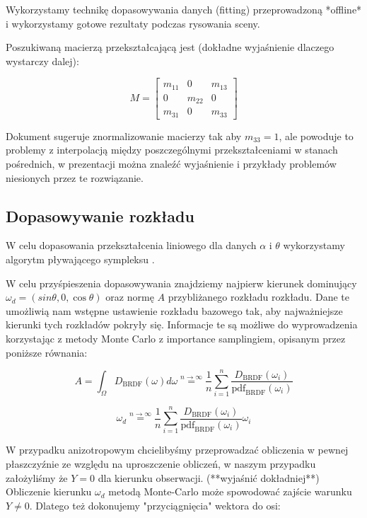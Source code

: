 \documentclass[../main.tex]{subfiles}
\begin{document}
Wykorzystamy technikę dopasowywania danych (fitting) przeprowadzoną
*offline* i wykorzystamy gotowe rezultaty podczas rysowania sceny.

Poszukiwaną macierzą przekształcającą jest (dokładne wyjaśnienie dlaczego
wystarczy dalej):

$$
M =
\begin{bmatrix}
  m_{11} & 0 & m_{13} \\
  0 & m_{22} & 0 \\
  m_{31} & 0 & m_{33}
\end{bmatrix}
$$

Dokument \cite{ltc_heitz} sugeruje znormalizowanie macierzy tak aby $m_{33}=1$,
ale powoduje to problemy z interpolacją między poszczególnymi przekształceniami
w stanach pośrednich, w prezentacji \cite{LTCJourneyPresentation} można znaleźć
wyjaśnienie i przykłady problemów niesionych przez te rozwiązanie.

\subsection{Dopasowywanie rozkładu}

W celu dopasowania przekształcenia liniowego dla danych $\alpha$
i $\theta$ wykorzystamy algorytm pływającego sympleksu \cite{NelderMead65}.

W celu przyśpieszenia dopasowywania znajdziemy najpierw kierunek dominujący
  $\omega_d = \left(sin\theta, 0, \cos\theta\right)$
oraz normę $A$ przybliżanego rozkładu rozkładu. Dane te umożliwią nam wstępne
ustawienie rozkładu bazowego tak, aby najważniejsze kierunki tych rozkładów
pokryły się. Informacje te są możliwe do wyprowadzenia korzystając z metody
Monte Carlo z importance samplingiem, opisanym przez poniższe równania:

$$
A = \int_{\Omega} D_{\text{BRDF}}(\omega)d\omega
\stackrel{n \rightarrow \infty}{=}
\frac{1}{n} \sum_{i=1}^{n} {
  \frac{
    D_{\text{BRDF}}(\omega_i)
  }{
    \text{pdf}_{\text{BRDF}}(\omega_i)
  }
}
$$

$$
\omega_d
\stackrel{n \rightarrow \infty}{=}
\frac{1}{n} \sum_{i=1}^{n} {
  \frac{
    D_{\text{BRDF}}(\omega_i)
  }{
    \text{pdf}_{\text{BRDF}}(\omega_i)
  }
  \omega_i
}
$$

W przypadku anizotropowym chcielibyśmy przeprowadzać obliczenia w pewnej
płaszczyźnie ze względu na uproszczenie obliczeń, w naszym przypadku
założyliśmy że $Y=0$ dla kierunku obserwacji. (**wyjaśnić dokładniej**)
Obliczenie kierunku $\omega_d$ metodą Monte-Carlo może spowodować zajście
warunku $Y \neq 0$. Dlatego też dokonujemy "przyciągnięcia" wektora do
osi:
\end{document}
